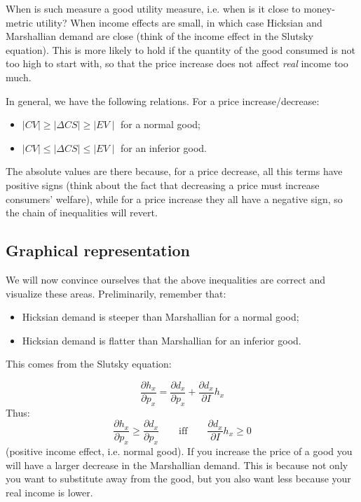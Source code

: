 \documentclass[11pt,english]{article}
\begin{document}
When is such measure a good utility measure, i.e. when is it close
to money-metric utility? When income effects are small, in which case
Hicksian and Marshallian demand are close (think of the income effect
in the Slutsky equation). This is more likely to hold if the quantity
of the good consumed is not too high to start with, so that the price
increase does not affect \emph{real} income too much.

In general, we have the following relations. For a price increase/decrease:
\begin{itemize}
\item $\mid CV\mid\geq\mid\Delta CS\mid\geq\mid EV\mid$ for a normal good;
\item $\mid CV\mid\leq\mid\Delta CS\mid\leq\mid EV\mid$ for an inferior
good.
\end{itemize}
The absolute values are there because, for a price decrease, all this terms have positive signs (think about the fact that decreasing a price must increase consumers' welfare), while for a price increase they all have a negative sign, so the chain of inequalities will revert.

\subsection{Graphical representation}

We will now convince ourselves that the above inequalities are correct
and visualize these areas. Preliminarily, remember that:
\begin{itemize}
\item Hicksian demand is steeper than Marshallian for a normal good;
\item Hicksian demand is flatter than Marshallian for an inferior good.
\end{itemize}
This comes from the Slutsky equation:

\[
\frac{\partial h_{x}}{\partial p_{x}}=\frac{\partial d_{x}}{\partial p_{x}}+\frac{\partial d_{x}}{\partial I}h_{x}
\]
Thus:
\[
\frac{\partial h_{x}}{\partial p_{x}}\geq\frac{\partial d_{x}}{\partial p_{x}}\qquad\text{iff}\qquad\frac{\partial d_{x}}{\partial I}h_{x}\geq0
\]
(positive income effect, i.e. normal good). If you increase the price
of a good you will have a larger decrease in the Marshallian demand.
This is because not only you want to substitute away from the good,
but you also want less because your real income is lower.
\end{document}
